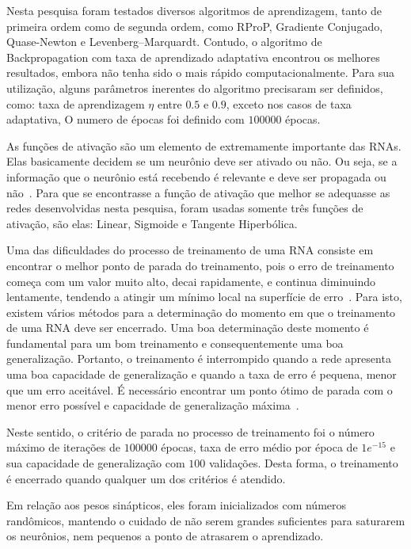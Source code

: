 Nesta pesquisa foram testados diversos algoritmos de aprendizagem, tanto de primeira ordem como de segunda ordem, como RProP, Gradiente Conjugado, Quase-Newton e Levenberg–Marquardt. Contudo, o algoritmo de Backpropagation com taxa de aprendizado adaptativa encontrou os melhores resultados, embora não tenha sido o mais rápido computacionalmente. Para sua utilização, alguns parâmetros inerentes do algoritmo precisaram ser definidos, como: taxa de aprendizagem $\eta$ entre $0.5$ e $0.9$, exceto nos casos de taxa adaptativa, O numero de épocas foi definido com $100000$ épocas.

As funções de ativação são um elemento de extremamente importante das RNAs. Elas basicamente decidem se um neurônio deve ser ativado ou não. Ou seja, se a informação que o neurônio está recebendo é relevante e deve ser propagada ou não~\cite{DeepLearningBook}. Para que se encontrasse a função de ativação que melhor se adequasse as redes desenvolvidas nesta pesquisa, foram usadas somente três funções de ativação, são elas: Linear, Sigmoide e Tangente Hiperbólica.

Uma das dificuldades do processo de treinamento de uma RNA consiste em encontrar o melhor ponto de parada do treinamento, pois o erro de treinamento começa com um valor muito alto, decai rapidamente, e continua diminuindo lentamente, tendendo a atingir um mínimo local na superfície de erro~\cite{haykin2007redes}. Para isto, existem vários métodos para a determinação do momento em que o treinamento de uma RNA deve ser encerrado. Uma boa determinação deste momento é fundamental para um bom treinamento e consequentemente uma boa generalização. Portanto, o treinamento é interrompido quando a rede apresenta uma boa capacidade de generalização e quando a taxa de erro é pequena, menor que um erro aceitável. É necessário encontrar um ponto ótimo de parada com o menor erro possível e capacidade de generalização máxima~\cite{barros2018avaliaccao}.

Neste sentido, o critério de parada no processo de treinamento foi o número máximo de iterações de $100000$ épocas, taxa de erro médio por época de $1e^{-15}$ e sua capacidade de generalização com $100$ validações. Desta forma, o treinamento é encerrado quando qualquer um dos critérios é atendido.

Em relação aos pesos sinápticos, eles foram inicializados com números randômicos, mantendo o cuidado de não serem grandes suficientes para saturarem os neurônios, nem pequenos a ponto de atrasarem o aprendizado.

